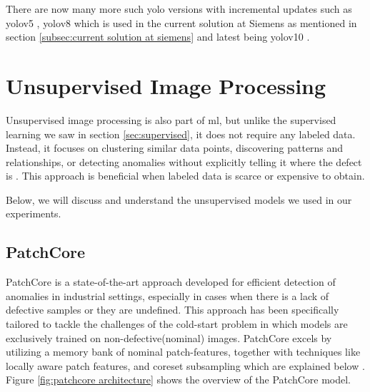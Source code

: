 There are now many more such \gls{yolo} versions with incremental updates such as \gls{yolo}v5 \cite{yolov5}, \gls{yolo}v8 \cite{Ultralytics2024} which is used in the current solution at Siemens as mentioned in section \ref{subsec:current solution at siemens} and latest being \gls{yolo}v10 \cite{Ultralytics2024v10}.

\section{Unsupervised Image Processing}

Unsupervised image processing is also part of \gls{ml}, but unlike the supervised learning we saw in section \ref{sec:supervised}, it does not require any labeled data. Instead, it focuses on clustering similar data points, discovering patterns and relationships, or detecting anomalies without explicitly telling it where the defect is \cite{geeksforgeeks-sup-unsup}. This approach is beneficial when labeled data is scarce or expensive to obtain.

Below, we will discuss and understand the unsupervised models we used in our experiments.


\subsection{PatchCore}
\label{subsec:patchcore}

PatchCore is a state-of-the-art approach developed for efficient detection of anomalies in industrial settings, especially in cases when there is a lack of defective samples or they are undefined. This approach has been specifically tailored to tackle the challenges of the cold-start problem in which models are exclusively trained on non-defective(nominal) images. PatchCore excels by utilizing a memory bank of nominal patch-features, together with techniques like locally aware patch features, and coreset subsampling which are explained below \cite{roth2022totalrecallindustrialanomaly}. Figure \ref{fig:patchcore architecture} shows the overview of the PatchCore model.

